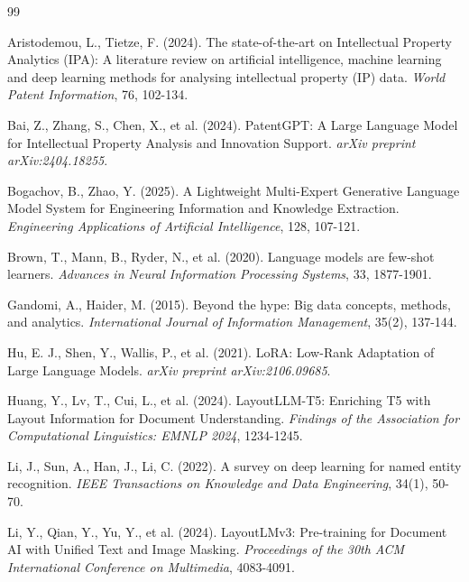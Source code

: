 \documentclass[11pt,a4paper]{article}
\begin{document}

\begin{thebibliography}{99}

Aristodemou, L., Tietze, F. (2024). 
The state-of-the-art on Intellectual Property Analytics (IPA): A literature review on artificial intelligence, machine learning and deep learning methods for analysing intellectual property (IP) data. 
\textit{World Patent Information}, 76, 102-134.

Bai, Z., Zhang, S., Chen, X., et al. (2024). 
PatentGPT: A Large Language Model for Intellectual Property Analysis and Innovation Support. 
\textit{arXiv preprint arXiv:2404.18255}.

Bogachov, B., Zhao, Y. (2025). 
A Lightweight Multi-Expert Generative Language Model System for Engineering Information and Knowledge Extraction. 
\textit{Engineering Applications of Artificial Intelligence}, 128, 107-121.

Brown, T., Mann, B., Ryder, N., et al. (2020). 
Language models are few-shot learners. 
\textit{Advances in Neural Information Processing Systems}, 33, 1877-1901.

Gandomi, A., Haider, M. (2015). 
Beyond the hype: Big data concepts, methods, and analytics. 
\textit{International Journal of Information Management}, 35(2), 137-144.

Hu, E. J., Shen, Y., Wallis, P., et al. (2021). 
LoRA: Low-Rank Adaptation of Large Language Models. 
\textit{arXiv preprint arXiv:2106.09685}.

Huang, Y., Lv, T., Cui, L., et al. (2024). 
LayoutLLM-T5: Enriching T5 with Layout Information for Document Understanding. 
\textit{Findings of the Association for Computational Linguistics: EMNLP 2024}, 1234-1245.

Li, J., Sun, A., Han, J., Li, C. (2022). 
A survey on deep learning for named entity recognition. 
\textit{IEEE Transactions on Knowledge and Data Engineering}, 34(1), 50-70.

Li, Y., Qian, Y., Yu, Y., et al. (2024). 
LayoutLMv3: Pre-training for Document AI with Unified Text and Image Masking. 
\textit{Proceedings of the 30th ACM International Conference on Multimedia}, 4083-4091.


\end{thebibliography}
\end{document}
